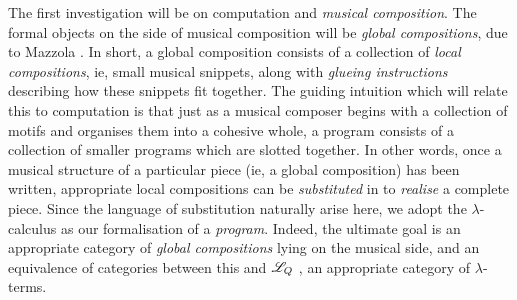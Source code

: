  The first investigation will be on computation and \emph{musical composition}. The formal objects on the side of musical composition will be \emph{global compositions}, due to Mazzola \cite{Mazzola}. In short, a global composition consists of a collection of \emph{local compositions}, ie, small musical snippets, along with \emph{glueing instructions} describing how these snippets fit together. The guiding intuition which will relate this to computation is that just as a musical composer begins with a collection of motifs and organises them into a cohesive whole, a program consists of a collection of smaller programs which are slotted together. In other words, once a musical structure of a particular piece (ie, a global composition) has been written, appropriate local compositions can be \emph{substituted} in to \emph{realise} a complete piece. Since the language of substitution naturally arise here, we adopt the $\lambda$-calculus as our formalisation of a \emph{program}. Indeed, the ultimate goal is an appropriate category of \emph{global compositions} lying on the musical side, and an equivalence of categories between this and $\mathscr{L}_Q$ \cite{MurfetTroiani}, an appropriate category of $\lambda$-terms.
